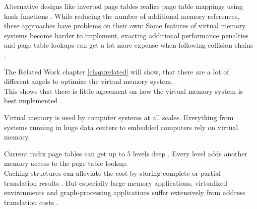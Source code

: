 Alternative designs like inverted page tables realize page table mappings using hash functions \cite{tanenbaumOS}. While reducing the number of additional memory references, these approaches have problems on their own: Some features of virtual memory systems become harder to implement, exacting additional performance penalties \cite{yaniv2016hash} and page table lookups can get a lot more expense when following collision chains \cite{jacob1998look}.

The Related Work chapter \ref{chap:related} will show, that there are a lot of different angels to optimize the virtual memory system.\\
This shows that there is little agreement on how the virtual memory system is best implemented \cite{jacob1998look}.\\



\label{Intro}

Virtual memory is used by computer systems at all scales. Everything from systems running in huge data
centers to embedded computers rely on virtual memory.

Current radix page tables can get up to 5 levels deep \cite{intel5LevelPaging5Level2017}. Every level
adds another memory access to the page table lookup.\\
Caching structures can alleviate the cost by storing complete or partial translation results \cite{van2002memory}.
But especially large-memory applications, virtualized environments and graph-processing applications
suffer extensively from address translation costs \cite{zagieboylo2020cost}.



\cite{jacobVirtualMemoryContemporary1998,jacob1998virtualissues}

